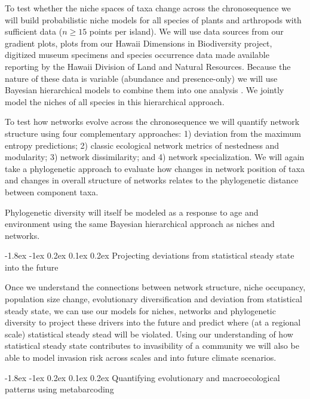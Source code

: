 \documentclass[11pt]{article}
\makeatletter
\renewcommand\subsubsection{\@startsection{subsection}{1}{\z@}%
                                  {-1.8ex \@plus -1ex \@minus 0.2ex}%
                                  {0.1ex \@plus 0.2ex}%
                                  {\normalfont\bfseries}}
\makeatother
\begin{document}
To test whether the niche spaces of taxa change across the
chronosequence we will build probabilistic niche models for all
species of plants and arthropods with sufficient data ($n \geq 15$
points per island).  We will use data sources from our gradient plots,
plots from our Hawaii Dimensions in Biodiversity project, digitized
museum specimens and species occurrence data made available reporting
by the Hawaii Division of Land and Natural Resources.  Because the
nature of these data is variable (abundance and presence-only) we will
use Bayesian hierarchical models to combine them into one analysis
\citep{hsdm}.  We jointly model the niches of all species in this
hierarchical approach.

To test how networks evolve across the chronosequence we will quantify
network structure using four complementary approaches: 1) deviation
from the maximum entropy predictions; 2) classic ecological network
metrics of nestedness and modularity; 3) network dissimilarity; and 4)
network specialization.  We will again take a phylogenetic approach to
evaluate how changes in network position of taxa and changes in
overall structure of networks relates to the phylogenetic distance
between component taxa.

Phylogenetic diversity will itself be modeled as a response to age and
environment using the same Bayesian hierarchical approach as niches
and networks.


\subsubsection{Projecting deviations from statistical steady state
  into the future}

Once we understand the connections between network structure, niche
occupancy, population size change, evolutionary diversification and
deviation from statistical steady state, we can use our models for
niches, networks and phylogenetic diversity to project these drivers
into the future and predict where (at a regional scale) statistical
steady stead will be violated.  Using our understanding of how
statistical steady state contributes to invasibility of a community we
will also be able to model invasion risk across scales and into future
climate scenarios.

\subsubsection{Quantifying evolutionary and macroecological patterns
  using metabarcoding}
\end{document}
